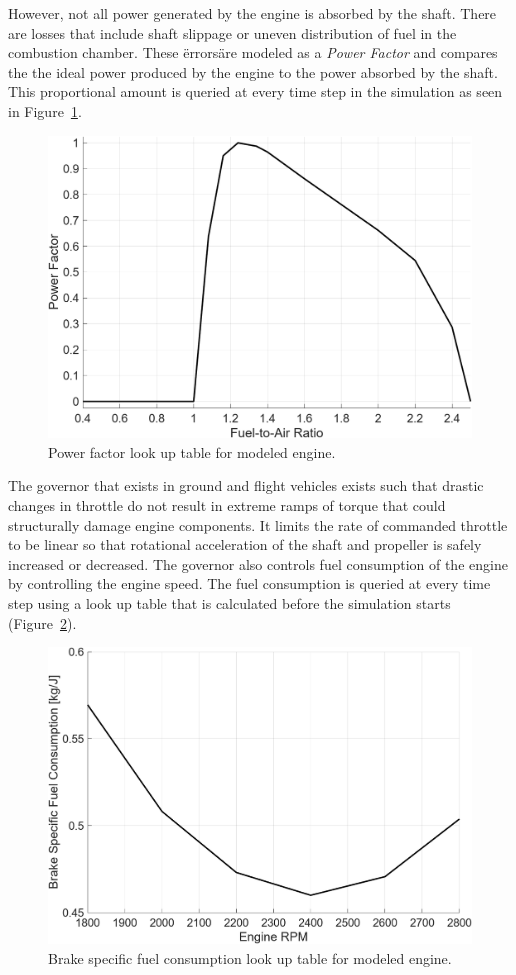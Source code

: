 \documentclass[12pt]{report}
\begin{document}
However, not all power generated by the engine is absorbed by the shaft. There are losses that include shaft slippage or uneven distribution of fuel in the combustion chamber. These \"errors\" are modeled as a \textit{Power Factor} and compares the the ideal power produced by the engine to the power absorbed by the shaft. This proportional amount is queried at every time step in the simulation as seen in Figure~\ref{fig:PFLUT}.

\begin{figure}[!ht]\label{fig:PFLUT}
  \centering
  \includegraphics[width=.75\linewidth]{Figures/PFLUT.png}
  \caption{Power factor look up table for modeled engine.}
\end{figure}

The governor that exists in ground and flight vehicles exists such that drastic changes in throttle do not result in extreme ramps of torque that could structurally damage engine components. It limits the rate of commanded throttle to be linear so that rotational acceleration of the shaft and propeller is safely increased or decreased. The governor also controls fuel consumption of the engine by controlling the engine speed. The fuel consumption is queried at every time step using a look up table that is calculated before the simulation starts (Figure~\ref{fig:BSFCLUT}).

\begin{figure}[!ht]\label{fig:BSFCLUT}
  \centering
  \includegraphics[width=.75\linewidth]{Figures/BSFCLUT.png}
  \caption{Brake specific fuel consumption look up table for modeled engine.}
\end{figure}
\end{document}

